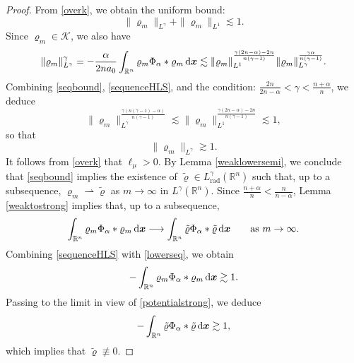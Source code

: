 \documentclass[reqno,11pt]{amsart}
\numberwithin{equation}{section}
\theoremstyle{definition}
\def\dd{{\, \rm d}}
\begin{document}
\begin{proof}
From \eqref{overk}, we obtain the uniform bound:
    \begin{equation}\label{seqbound}
 \| \varrho_m \|_{L^\gamma} + \| \varrho_m \|_{L^1} \lesssim 1.
    \end{equation}
  Since $\varrho_m \in \mathcal{K}$, we also have
    \begin{equation}\label{sequenceHLS}
 \| \varrho_m \|_{L^\gamma}^\gamma = - \frac{\alpha}{2 n a_0} \int_{\mathbb{R}^n} \varrho_m \Phi_\alpha * \varrho_m \dd \boldsymbol{x} \lesssim \| \varrho_m \|_{L^1}^\frac{\gamma(2n - \alpha) - 2n}{n(\gamma - 1)} \| \varrho_m \|_{L^\gamma}^\frac{\gamma \alpha}{n(\gamma - 1)}.
    \end{equation}
Combining \eqref{seqbound}, \eqref{sequenceHLS}, and the condition:
    $\frac{2n}{2n - \alpha} < \gamma < \frac{n + \alpha}{n}$, 
we deduce 
    \[
 \| \varrho_m \|_{L^\gamma}^\frac{\gamma(n(\gamma - 1) - \alpha)}{n(\gamma - 1)} \lesssim \| \varrho_m \|_{L^1}^\frac{\gamma(2n - \alpha) - 2n}{n(\gamma - 1)} \lesssim 1,
    \]
so that
    \begin{equation}\label{lowerseq}
  \| \varrho_m \|_{L^\gamma} \gtrsim 1.
    \end{equation}
It follows from \eqref{overk} that $\ell_\mu > 0$. By Lemma \ref{weaklowersemi}, we conclude that \eqref{seqbound} 
    implies the existence of $\tilde{\varrho} \in L^\gamma_{\text{rad}}(\mathbb{R}^n)$ 
    such that, up to a subsequence, 
    $\varrho_m \rightharpoonup \tilde{\varrho}$ as $m \to \infty$ in $L^\gamma(\mathbb{R}^n)$. Since $\frac{n+\alpha}{n} < \frac{n}{n-\alpha}$, Lemma \ref{weaktostrong} implies that,
    up to a subsequence,
    \begin{equation}\label{potentialstrong}
 \int_{\mathbb{R}^n} \varrho_m \Phi_\alpha * \varrho_m \dd \boldsymbol{x} \longrightarrow \int_{\mathbb{R}^n} \tilde{\varrho} \Phi_\alpha * \tilde{\varrho} \dd \boldsymbol{x}
      \qquad\mbox{as $m \to \infty$.}  
    \end{equation}
    Combining \eqref{sequenceHLS} with \eqref{lowerseq}, we obtain 
    \[
    - \int_{\mathbb{R}^n} \varrho_m \Phi_\alpha * \varrho_m \dd \boldsymbol{x} \gtrsim 1.
    \]
Passing to the limit in view of \eqref{potentialstrong}, we deduce
    \[
    - \int_{\mathbb{R}^n} \tilde{\varrho} \Phi_\alpha * \tilde{\varrho} \dd \boldsymbol{x} \gtrsim 1,
    \]
   which implies that $\tilde{\varrho} \not \equiv 0$.
    

\end{proof}
\end{document}
